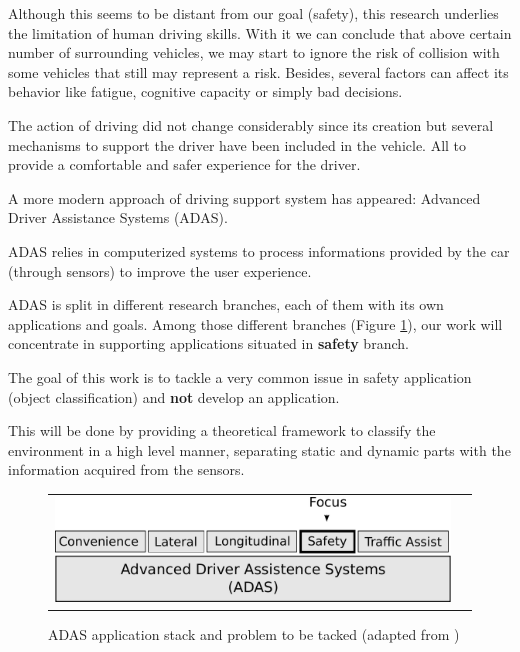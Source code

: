 Although this seems to be distant from our goal (safety), this research underlies the limitation of human driving skills. With it we can conclude that above certain number of surrounding vehicles, we may start to ignore the risk of collision with some vehicles that still may represent a risk. Besides, several factors can affect its behavior like fatigue, cognitive capacity or simply bad decisions.


The action of driving did not change considerably since its creation but several mechanisms to support the driver have been included in the vehicle. All to provide a comfortable and safer experience for the driver\cite{riener2010sensor}.

A more modern approach of driving support system has appeared: Advanced Driver Assistance Systems (ADAS). 

ADAS relies in computerized systems to process informations provided by the car (through sensors) to improve the user experience. 

ADAS is split in different research branches, each of them with its own applications and goals. Among those different branches (Figure \ref{fig:sensor:target}), our work will concentrate in supporting applications situated in \textbf{safety} branch. 

The goal of this work is to tackle a very common issue in safety application (object classification) and \textbf{not} develop an application.

This will be done by providing a theoretical framework to classify the environment in a high level manner, separating static and dynamic parts with the information acquired from the sensors.

\begin{figure}[h]
\centering
	\begin{tabular}{lr}\\
		\includegraphics[scale=0.7]{img/fig:sensor:target} 
	\end{tabular}
	\caption{ADAS application stack and problem to be tacked (adapted from \cite{riener2010sensor})}
	\label{fig:sensor:target}
\end{figure}

